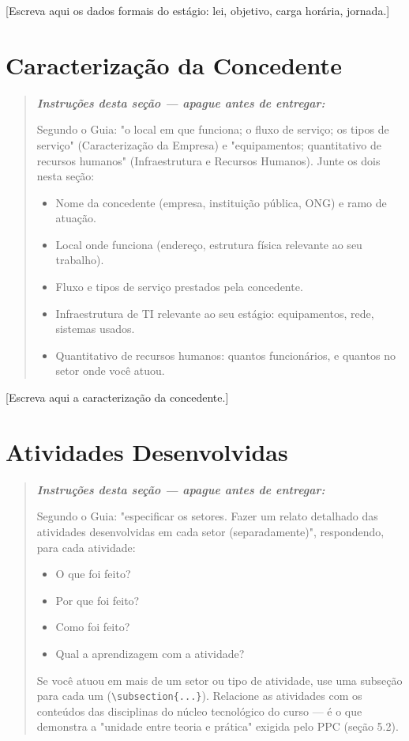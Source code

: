 \documentclass[article,12pt,a4paper,oneside]{abntex2}
\newenvironment{instrucoes}{%
  \begin{quotation}\footnotesize\itshape
  \noindent\textbf{\upshape Instruções desta seção — apague antes de entregar:}\par\smallskip
}{%
  \end{quotation}
}
\begin{document}
[Escreva aqui os dados formais do estágio: lei, objetivo, carga horária, jornada.]

\section{Caracterização da Concedente}

\begin{instrucoes}
Segundo o Guia: "o local em que funciona; o fluxo de serviço; os tipos de serviço" (Caracterização da Empresa) e "equipamentos; quantitativo de recursos humanos" (Infraestrutura e Recursos Humanos). Junte os dois nesta seção:
\begin{itemize}
  \item Nome da concedente (empresa, instituição pública, ONG) e ramo de atuação.
  \item Local onde funciona (endereço, estrutura física relevante ao seu trabalho).
  \item Fluxo e tipos de serviço prestados pela concedente.
  \item Infraestrutura de TI relevante ao seu estágio: equipamentos, rede, sistemas usados.
  \item Quantitativo de recursos humanos: quantos funcionários, e quantos no setor onde você atuou.
\end{itemize}
\end{instrucoes}

[Escreva aqui a caracterização da concedente.]

\section{Atividades Desenvolvidas}

\begin{instrucoes}
Segundo o Guia: "especificar os setores. Fazer um relato detalhado das atividades desenvolvidas em cada setor (separadamente)", respondendo, para cada atividade:
\begin{itemize}
  \item O que foi feito?
  \item Por que foi feito?
  \item Como foi feito?
  \item Qual a aprendizagem com a atividade?
\end{itemize}
Se você atuou em mais de um setor ou tipo de atividade, use uma subseção para cada um (\texttt{\textbackslash subsection\{...\}}). Relacione as atividades com os conteúdos das disciplinas do núcleo tecnológico do curso — é o que demonstra a "unidade entre teoria e prática" exigida pelo PPC (seção 5.2).
\end{instrucoes}
\end{document}
